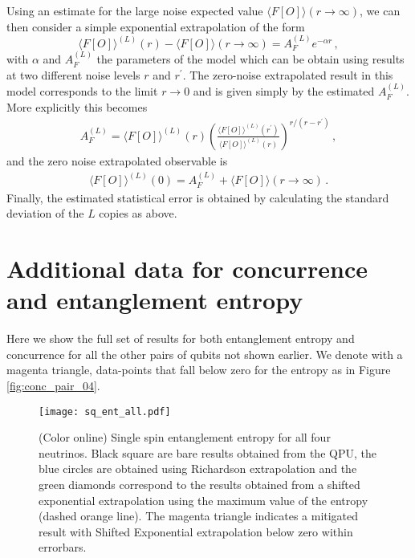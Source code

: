 \documentclass[Dual]{msu-thesis}
\begin{document}
Using an estimate for the large noise expected value $\langle F[O]\rangle(r\rightarrow\infty)$, we can then consider a simple exponential extrapolation of the form
\begin{equation}
\langle F[O]\rangle^{(L)}(r)-\langle F[O]\rangle(r\rightarrow\infty) = A^{(L)}_F e^{-\alpha r}\, ,
\label{eq:exp-reshifted}
\end{equation}
with $\alpha $ and $A^{(L)}_F$ the parameters of the model which can be obtain using results at two different noise levels $r$ and $r^\prime$.
The zero-noise extrapolated result in this model corresponds to the limit $r\to0$ and is given simply by the estimated $A^{(L)}_F$. More explicitly this becomes
\begin{eqnarray}
A^{(L)}_F=\langle F[O]\rangle^{(L)}(r)\left(\frac{\langle F[O]\rangle^{(L)}(r^\prime)}{\langle F[O]\rangle^{(L)}(r)}\right)^{r/(r-r^\prime)}\, ,
\end{eqnarray}
and the zero noise extrapolated observable is
\begin{eqnarray}
\langle F[O]\rangle^{(L)}(0)=A^{(L)}_F+ \langle F[O]\rangle(r\rightarrow\infty)\, .
\end{eqnarray}
Finally, the estimated statistical error is obtained by calculating the standard deviation of the $L$ copies as above. 

\section{Additional data for concurrence and entanglement entropy}
\label{app:sq_ent}
Here we show the full set of results for both entanglement entropy and concurrence for all the other pairs of qubits not shown earlier. We denote with a magenta triangle, data-points that fall below zero for the entropy as in Figure \ref{fig:conc_pair_04}.

\begin{figure}[h!]
 \centering
 \texttt{[image: sq\_ent\_all.pdf]}
 \caption{(Color online) Single spin entanglement entropy for all four neutrinos. Black square are bare results obtained from the QPU, the blue circles are obtained using Richardson extrapolation and the green diamonds correspond to the results obtained from a shifted exponential extrapolation using the maximum value of the entropy (dashed orange line). The magenta triangle indicates a mitigated result with Shifted Exponential extrapolation below zero within errorbars.}
\label{fig:sq_all}
\end{figure}
\end{document}
